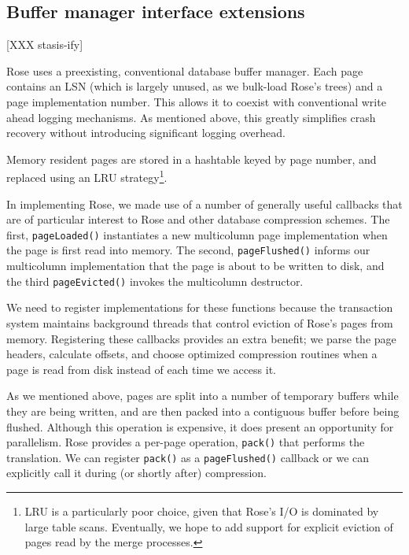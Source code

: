 \documentclass{vldb}
\newcommand{\rows}{Rose\xspace}
\newcommand{\rowss}{Rose's\xspace}
\begin{document}

\subsection{Buffer manager interface extensions}

[XXX stasis-ify]

\rows uses a preexisting, conventional database buffer manager.  Each
page contains an LSN (which is largely unused, as we bulk-load \rowss
trees) and a page implementation number.  This allows it to coexist
with conventional write ahead logging mechanisms.  As mentioned above,
this greatly simplifies crash recovery without introducing significant
logging overhead.

Memory resident pages are stored in a
hashtable keyed by page number, and replaced using an LRU
strategy\footnote{LRU is a particularly poor choice, given that \rowss
  I/O is dominated by large table scans.  Eventually, we hope to add
  support for explicit eviction of pages read by the merge processes.}.

In implementing \rows, we made use of a number of generally useful
callbacks that are of particular interest to \rows and other database
compression schemes.  The first, {\tt pageLoaded()} instantiates a new
multicolumn page implementation when the page is first read into
memory.  The second, {\tt pageFlushed()} informs our multicolumn
implementation that the page is about to be written to disk, and the
third {\tt pageEvicted()} invokes the multicolumn destructor.

We need to register implementations for these functions because the
transaction system maintains background threads that control eviction of \rowss
pages from memory.  Registering these callbacks provides an extra
benefit; we parse the page headers, calculate offsets,
and choose optimized compression routines when a page is read from
disk instead of each time we access it.

As we mentioned above, pages are split into a number of temporary
buffers while they are being written, and are then packed into a
contiguous buffer before being flushed.  Although this operation is
expensive, it does present an opportunity for parallelism.  \rows
provides a per-page operation, {\tt pack()} that performs the
translation.  We can register {\tt pack()} as a {\tt pageFlushed()}
callback or we can explicitly call it during (or shortly after)
compression.
\end{document}
